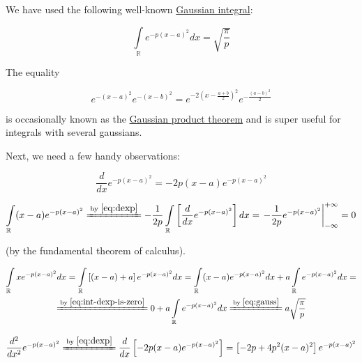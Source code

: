 \documentclass{article}
\newcommand{\equalby}[1]{\xlongequal{\text{by }\eqref{#1}}}
\newcommand{\intR}{\int\limits_\mathbb R}
\begin{document}
We have used the following well-known \href{https://en.wikipedia.org/wiki/Gaussian_integral}{Gaussian integral}:

\begin{equation} \label{eq:gauss}
\intR e^{-p(x-a)^2} dx = \sqrt{\frac{\pi}{p}}
\end{equation}

The equality

\begin{equation} \label{eq:gauss-product}
e^{-(x-a)^2} e^{-(x-b)^2} = e^{-2\left(x-\frac{a+b}{2}\right)^2} e^{-\frac{(a-b)^2}{2}}
\end{equation}

is occasionally known as the \href{https://en.wikipedia.org/wiki/Gaussian_orbital#Rationale}{Gaussian product theorem} and is super useful for integrals with several gaussians.

Next, we need a few handy observations:

\begin{equation} \label{eq:dexp}
\frac{d}{dx} e^{-p(x-a)^2} = -2p(x-a)e^{-p(x-a)^2}
\end{equation}

\begin{equation} \label{eq:int-dexp-is-zero}
\intR (x-a)e^{-p(x-a)^2} \equalby{eq:dexp} -\frac{1}{2p} \intR \left[\frac{d}{dx} e^{-p(x-a)^2}\right] dx = \left. -\frac{1}{2p} e^{-p(x-a)^2}\right\vert_{-\infty}^{+\infty} = 0
\end{equation}

(by the fundamental theorem of calculus).

\begin{equation} \label{eq:int-x-exp}
\begin{gathered}
\intR x e^{-p(x-a)^2} dx = \intR \left[ (x-a)+a\right] e^{-p(x-a)^2} dx = \intR (x-a)e^{-p(x-a)^2} dx + a \intR e^{-p(x-a)^2} dx = \\
\equalby{eq:int-dexp-is-zero} 0 + a \intR e^{-p(x-a)^2} dx \equalby{eq:gauss} a \sqrt\frac{\pi}{p}
\end{gathered}
\end{equation}

\begin{equation} \label{eq:ddexp}
\frac{d^2}{dx^2} e^{-p(x-a)^2} \equalby{eq:dexp} \frac{d}{dx} \left[ -2p(x-a)e^{-p(x-a)^2} \right] = \left[-2p + 4p^2(x-a)^2\right] e^{-p(x-a)^2}
\end{equation}
\end{document}
